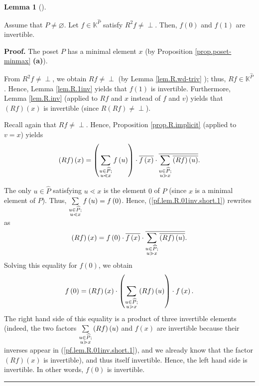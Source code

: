 \documentclass[numbers=enddot,12pt,final,onecolumn,notitlepage]{scrartcl}%
\theoremstyle{definition}
\newtheorem{lem}[theo]{Lemma}
\newenvironment{lemma}[1][]
{\begin{lem}[#1]\begin{leftbar}}
{\end{leftbar}\end{lem}}
\newenvironment{vershort}{}{}
\newcommand{\undf}{\operatorname*{\bot}}
\newenvironment{proof}[1][Proof]{\noindent\textbf{#1.} }{\ \rule{0.5em}{0.5em}}
\let\sumnonlimits\sum
\renewcommand{\sum}{\sumnonlimits\limits}
\begin{document}
\begin{lemma}
\label{lem.R.01inv}Assume that $P\neq\varnothing$. Let $f\in\mathbb{K}%
^{\widehat{P}}$ satisfy $R^{2}f\neq\undf$. Then, $f\left(  0\right)  $ and
$f\left(  1\right)  $ are invertible.
\end{lemma}

\begin{vershort}
\begin{proof}
The poset $P$ has a minimal element $x$ (by Proposition
\ref{prop.poset-minmax} \textbf{(a)}).

From $R^{2}f \neq\undf$, we obtain $Rf\neq\undf$ (by Lemma \ref{lem.R.wd-triv}%
); thus, $Rf\in\mathbb{K}^{\widehat{P}}$. Hence, Lemma \ref{lem.R.1inv} yields
that $f\left(  1\right)  $ is invertible. Furthermore, Lemma \ref{lem.R.inv}
(applied to $Rf$ and $x$ instead of $f$ and $v$) yields that $\left(
Rf\right)  \left(  x\right)  $ is invertible (since $R\left(  Rf\right)
\neq\undf$).

Recall again that $Rf\neq\undf$. Hence, Proposition \ref{prop.R.implicit}
(applied to $v=x$) yields%
\begin{equation}
\left(  Rf\right)  \left(  x\right)  =\left(  \sum\limits_{\substack{u\in
\widehat{P};\\u\lessdot x}}f\left(  u\right)  \right)  \cdot\overline{f\left(
x\right)  }\cdot\overline{\sum\limits_{\substack{u\in\widehat{P};\\u\gtrdot
x}}\overline{\left(  Rf\right)  \left(  u\right)  }}.
\label{pf.lem.R.01inv.short.1}%
\end{equation}


The only $u\in\widehat{P}$ satisfying $u\lessdot x$ is the element $0$ of
$\widehat{P}$ (since $x$ is a minimal element of $P$). Thus, $\sum
\limits_{\substack{u\in\widehat{P};\\u\lessdot x}}f\left(  u\right)  =f\left(
0\right)  $. Hence, (\ref{pf.lem.R.01inv.short.1}) rewrites as%
\[
\left(  Rf\right)  \left(  x\right)  =f\left(  0\right)  \cdot\overline
{f\left(  x\right)  }\cdot\overline{\sum\limits_{\substack{u\in\widehat{P}%
;\\u\gtrdot x}}\overline{\left(  Rf\right)  \left(  u\right)  }}.
\]
Solving this equality for $f\left(  0\right)  $, we obtain
\[
f\left(  0\right)  = \left(  Rf\right)  \left(  x\right)  \cdot\left(
\sum\limits_{\substack{u\in\widehat{P};\\u\gtrdot x}} \left(  Rf\right)
\left(  u\right)  \right)  \cdot f\left(  x\right)  .
\]
The right hand side of this equality is a product of three invertible elements
(indeed, the two factors $\sum\limits_{\substack{u\in\widehat{P};\\u\gtrdot
x}} \left(  Rf\right)  \left(  u\right)  $ and $f\left(  x\right)  $ are
invertible because their inverses appear in (\ref{pf.lem.R.01inv.short.1}),
and we already know that the factor $\left(  Rf\right)  \left(  x\right)  $ is
invertible), and thus itself invertible. Hence, the left hand side is
invertible. In other words, $f\left(  0\right)  $ is invertible.
\end{proof}
\end{vershort}
\end{document}
